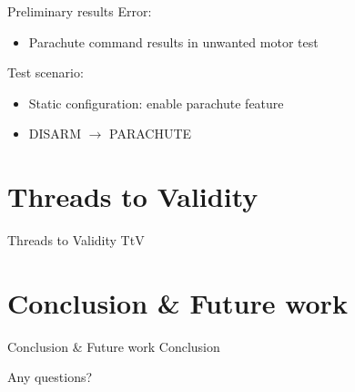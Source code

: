 	\begin{frame}{Preliminary results}
		Error:
		\begin{itemize}
			\item[] Parachute command results in unwanted motor test
		\end{itemize}

		\pause
		Test scenario:
		\begin{itemize}
			\item[] Static configuration: enable parachute feature
			\item[] DISARM $\rightarrow$ PARACHUTE
		\end{itemize}
	\end{frame}

\section{Threads to Validity}
	\begin{frame}{Threads to Validity}
		TtV
	\end{frame}

\section{Conclusion \& Future work}
	\begin{frame}{Conclusion \& Future work}
		Conclusion
	\end{frame}

\begin{frame}[standout]

	{\Large Any questions?}

\end{frame}





